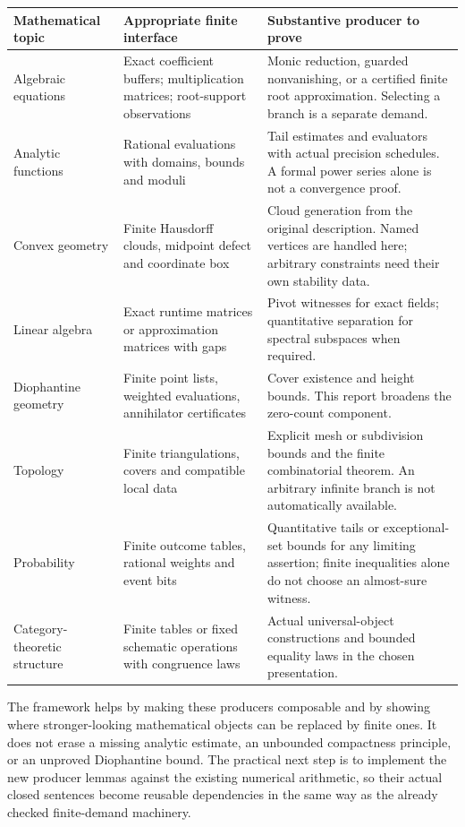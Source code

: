 \begin{longtable}{@{}P{0.22\textwidth}P{0.33\textwidth}P{0.39\textwidth}@{}}
\toprule
Mathematical topic & Appropriate finite interface & Substantive producer to prove\\
\midrule
\endhead
Algebraic equations & Exact coefficient buffers; multiplication matrices; root-support observations & Monic reduction, guarded nonvanishing, or a certified finite root approximation. Selecting a branch is a separate demand.\\[4pt]
Analytic functions & Rational evaluations with domains, bounds and moduli & Tail estimates and evaluators with actual precision schedules. A formal power series alone is not a convergence proof.\\[4pt]
Convex geometry & Finite Hausdorff clouds, midpoint defect and coordinate box & Cloud generation from the original description. Named vertices are handled here; arbitrary constraints need their own stability data.\\[4pt]
Linear algebra & Exact runtime matrices or approximation matrices with gaps & Pivot witnesses for exact fields; quantitative separation for spectral subspaces when required.\\[4pt]
Diophantine geometry & Finite point lists, weighted evaluations, annihilator certificates & Cover existence and height bounds. This report broadens the zero-count component.\\[4pt]
Topology & Finite triangulations, covers and compatible local data & Explicit mesh or subdivision bounds and the finite combinatorial theorem. An arbitrary infinite branch is not automatically available.\\[4pt]
Probability & Finite outcome tables, rational weights and event bits & Quantitative tails or exceptional-set bounds for any limiting assertion; finite inequalities alone do not choose an almost-sure witness.\\[4pt]
Category-theoretic structure & Finite tables or fixed schematic operations with congruence laws & Actual universal-object constructions and bounded equality laws in the chosen presentation.\\
\bottomrule
\end{longtable}

The framework helps by making these producers composable and by showing where stronger-looking mathematical objects can be replaced by finite ones. It does not erase a missing analytic estimate, an unbounded compactness principle, or an unproved Diophantine bound. The practical next step is to implement the new producer lemmas against the existing numerical arithmetic, so their actual closed sentences become reusable dependencies in the same way as the already checked finite-demand machinery.
